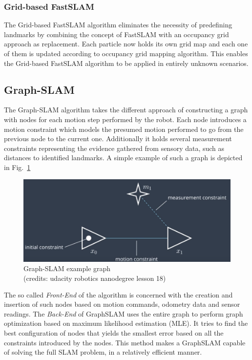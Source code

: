 \documentclass[10pt,journal,compsoc]{IEEEtran}
\begin{document}
\subsubsection{Grid-based FastSLAM}
The Grid-based FastSLAM algorithm eliminates the necessity of predefining landmarks by combining the concept of FastSLAM with an occupancy grid approach as replacement. Each particle now holds its own grid map and each one of them is updated according to occupancy grid mapping algorithm. This enables the Grid-based FastSLAM algorithm to be applied in entirely unknown scenarios.

\subsection{Graph-SLAM}
The Graph-SLAM\cite{thrun_graph_2006} algorithm takes the different approach of constructing a graph with nodes for each motion step performed by the robot. Each node introduces a motion constraint which models the presumed motion performed to go from the previous node to the current one. Additionally it holds several measurement constraints representing the evidence gathered from sensory data, such as distances to identified landmarks. A simple example of such a graph is depicted in Fig.~\ref{fig:graph_slam_example_graph}

\begin{figure}[thpb]
    \centering
    \includegraphics[width=0.9\linewidth]{img/graph_slam_example_graph.png}
    \caption{Graph-SLAM example graph \\(credits: udacity robotics nanodegree lesson 18)}
    \label{fig:graph_slam_example_graph}
\end{figure}

The so called \textit{Front-End} of the algorithm is concerned with the creation and insertion of such nodes based on motion commands, odometry data and sensor readings.
The \textit{Back-End} of GraphSLAM uses the entire graph to perform graph optimization based on maximum likelihood estimation (MLE). It tries to find the best configuration of nodes that yields the smallest error based on all the constraints introduced by the nodes. This method makes a GraphSLAM capable of solving the full SLAM problem, in a relatively efficient manner.
\end{document}
